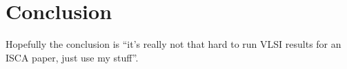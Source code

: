 \documentclass{article}
\begin{document}
\chapter{Conclusion}

Hopefully the conclusion is ``it's really not that hard to run VLSI results for
an ISCA paper, just use my stuff''.
\end{document}
